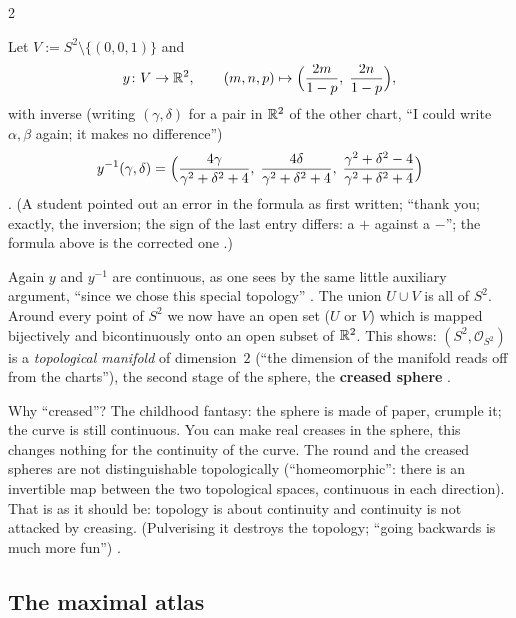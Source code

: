 \begin{paracol}{2}
\begin{example}\label{ex:sp-chart-y}
Let $V:=S^2\setminus\{(0,0,1)\}$ and
\[
  y\colon V\to\mathbb{R}^2,\qquad (m,n,p)\mapsto\Bigl(\frac{2m}{1-p},\;\frac{2n}{1-p}\Bigr),
\]
with inverse (writing $(\gamma,\delta)$ for a pair in $\mathbb{R}^2$ of the other chart, ``I could write $\alpha,\beta$ again; it makes no difference'')
\begin{equation}\label{eq:sp-y-inverse}
  y^{-1}(\gamma,\delta)=\Bigl(\frac{4\gamma}{\gamma^2+\delta^2+4},\;\frac{4\delta}{\gamma^2+\delta^2+4},\;\frac{\gamma^2+\delta^2-4}{\gamma^2+\delta^2+4}\Bigr)
\end{equation}
. (A student pointed out an error in the formula as first written; ``thank you; exactly, the inversion; the sign of the last
entry differs: a $+$ against a $-$''; the formula above is the corrected one .)
\end{example}
Again $y$ and $y^{-1}$ are continuous, as one sees by the same little auxiliary argument, ``since we chose this special topology''
.
The union $U\cup V$ is all of $S^2$. Around every point of $S^2$ we now have an open set ($U$ or $V$) which is mapped bijectively and
bicontinuously onto an open subset of $\mathbb{R}^2$. This shows: $(S^2,\mathcal O_{S^2})$ is a \emph{topological manifold} of dimension~$2$
(``the dimension of the manifold reads off from the charts''), the second stage of the sphere, the \textbf{creased sphere}
.

Why ``creased''? The childhood fantasy: the sphere is made of paper, crumple it; the curve is still continuous. You can make real
creases in the sphere, this changes nothing for the continuity of the curve. The round and the creased spheres are not distinguishable
topologically (``homeomorphic'': there is an invertible map between the two topological spaces, continuous in each direction). That is as it should be:
topology is about continuity and continuity is not attacked by creasing. (Pulverising it destroys the topology; ``going backwards is
much more fun'') .

\subsection{The maximal atlas}


\end{paracol}
